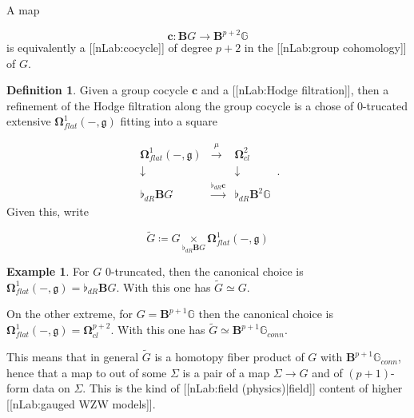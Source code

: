 \documentclass[12pt,titlepage]{article}
\newcommand{\itexarray}[1]{\begin{matrix}#1\end{matrix}}
\theoremstyle{plain}
\theoremstyle{definition}
\newtheorem{defn}{Definition}
\newtheorem{example}{Example}
\theoremstyle{remark}
\begin{document}
A map

\begin{displaymath}
\mathbf{c} \colon \mathbf{B}G \longrightarrow \mathbf{B}^{p+2} \mathbb{G}
\end{displaymath}
is equivalently a [[nLab:cocycle]] of degree $p+2$ in the [[nLab:group cohomology]] of $G$.

\begin{defn}
\label{FormRefinementOfCocycle}\hypertarget{FormRefinementOfCocycle}{}
Given a group cocycle $\mathbf{c}$ and a [[nLab:Hodge filtration]], then a refinement of the Hodge filtration along the group cocycle is a chose of 0-trucated extensive $\mathbf{\Omega}^1_{flat}(-,\mathfrak{g})$ fitting into a square

\begin{displaymath}
\itexarray{
    \mathbf{\Omega}^1_{flat}(-,\mathfrak{g})
    &\stackrel{\mu}{\longrightarrow}&
    \mathbf{\Omega}^2_{cl}
    \\
    \downarrow && \downarrow
    \\
    \flat_{dR} \mathbf{B}G
    &\stackrel{\flat_{dR}\mathbf{c}}{\longrightarrow}&
    \flat_{dR} \mathbf{B}^2 \mathbb{G}
  }
  \,.
\end{displaymath}
Given this, write

\begin{displaymath}
\tilde G
  \coloneqq G \underset{\flat_{dR}\mathbf{B}G}{\times} \mathbf{\Omega}^1_{flat}(-,\mathfrak{g})
\end{displaymath}
\end{defn}
\begin{example}
\label{}\hypertarget{}{}
For $G$ 0-truncated, then the canonical choice is $\mathbf{\Omega}^1_{flat}(-,\mathfrak{g}) = \flat_{dR}\mathbf{B}G$. With this one has $\tilde G \simeq G$.

On the other extreme, for $G = \mathbf{B}^{p+1}\mathbb{G}$ then the canonical choice is $\mathbf{\Omega}^1_{flat}(-,\mathfrak{g}) = \mathbf{\Omega}^{p+2}_{cl}$. With this one has $\tilde G \simeq \mathbf{B}^{p+1}\mathbb{G}_{conn}$.

This means that in general $\tilde G$ is a homotopy fiber product of $G$ with $\mathbf{B}^{p+1}\mathbb{G}_{conn}$, hence that a map to out of some $\Sigma$ is a pair of a map $\Sigma \to G$ and of $(p+1)$-form data on $\Sigma$. This is the kind of [[nLab:field (physics)|field]] content of higher [[nLab:gauged WZW models]].

\end{example}
\end{document}
